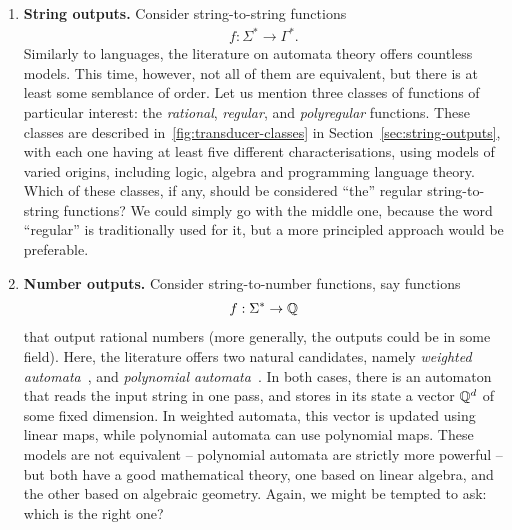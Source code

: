 \begin{enumerate}
    \item \textbf{String outputs.}
Consider string-to-string functions 
\begin{align*}
f : \Sigma^* \to \Gamma^*.
\end{align*}
Similarly to languages, the literature on automata theory offers countless  models. This time, however, not all of them are equivalent, but there is at least some semblance of order. Let us mention three classes of functions  of particular interest:  the \emph{rational}, \emph{regular}, and \emph{polyregular} functions. These classes are described in~\cref{fig:transducer-classes} in Section~\ref{sec:string-outputs}, with each one having at least five different characterisations, using models of varied origins, including logic, algebra and programming language theory. Which of these classes, if any, should be considered ``the'' regular string-to-string functions? We could simply go with the middle one, because  the word ``regular'' is traditionally used for it, but a more principled approach would be preferable.

\item \textbf{Number outputs.}
Consider string-to-number functions, say functions 
\begin{align*}
f : \Sigma^* \to {\mathbb Q}
\end{align*}
that output rational numbers (more generally, the outputs could be in some field). Here, the literature offers two natural candidates, namely \emph{weighted automata}~\cite{schutzenberger1961definition}, and \emph{polynomial automata}~\cite[Section IV]{DBLP:conf/lics/BenediktDSW17}. In both cases, there is an automaton that reads the input string in one pass, and stores in its state a vector ${\mathbb Q}^d$ of some fixed dimension. In weighted automata, this vector is updated using linear maps, while polynomial automata can use polynomial maps. These models are not equivalent -- polynomial automata are strictly more powerful -- but both have a good mathematical theory, one based on linear algebra, and the other based on algebraic geometry. Again, we might be tempted to ask: which  is the right one?


\end{enumerate}
